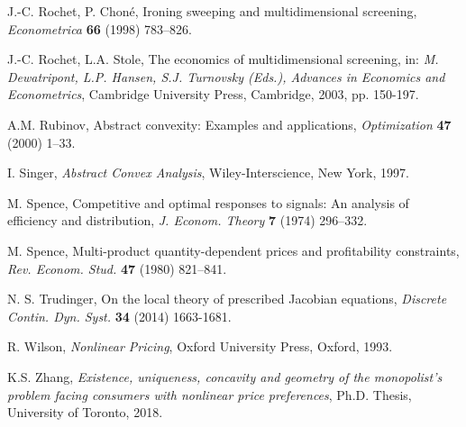\documentclass[a4paper, 11pt]{amsart}
\numberwithin{equation}{section}
\theoremstyle{plain}
\theoremstyle{definition}
\theoremstyle{remark}
\begin{document}
\begin{thebibliography}{BCDE}
	J.-C. Rochet, P. Chon\'e, 
	Ironing sweeping and multidimensional screening, 
	{\em Econometrica} {\bf 66} (1998) 783–826.
	
	J.-C. Rochet, L.A. Stole, 
	The economics of multidimensional screening, in: 
	{\em M. Dewatripont, L.P. Hansen, S.J. Turnovsky (Eds.),  Advances in Economics and Econometrics}, Cambridge University Press, Cambridge, 2003, pp. 150-197.
	
{	 
	A.M. Rubinov, 
	Abstract convexity: Examples and applications, 
	{\em Optimization} {\bf 47} (2000)  1–33. 
}

{ 
	I. Singer, 
	{\em Abstract Convex Analysis}, Wiley-Interscience, New York, 1997.
}

	M. Spence, 
	Competitive and optimal responses to signals: An analysis of efficiency and distribution, 
	{\em J. Econom. Theory} {\bf 7} (1974) 296–332.

	M. Spence, 
	Multi-product quantity-dependent prices and profitability constraints, 
	{\em Rev. Econom. Stud.} {\bf 47} (1980) 821–841.
	
	N. S. Trudinger, 
	On the local theory of prescribed Jacobian equations, 
	{\em Discrete Contin. Dyn. Syst.} {\bf 34} (2014) 1663-1681.



	R. Wilson, 
	{\em Nonlinear Pricing}, 
	Oxford University Press, Oxford, 1993.

	K.S. Zhang,
	{\em Existence, uniqueness, concavity and geometry of the monopolist’s
	problem facing consumers with nonlinear price preferences}, Ph.D. Thesis, University of Toronto, 2018.
	
	
\end{thebibliography}


\bigskip
\end{document}
